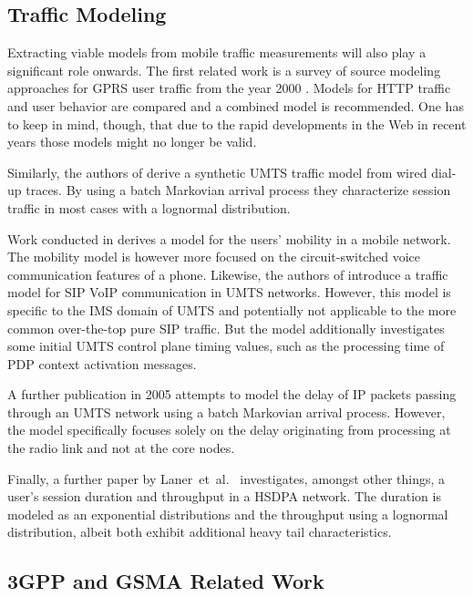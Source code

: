 \subsection{Traffic Modeling}

Extracting viable models from mobile traffic measurements will also play a significant role onwards. The first related work is a survey of source modeling approaches for \gls{GPRS} user traffic from the year 2000 \cite{staehle2000source}. Models for \gls{HTTP} traffic and user behavior are compared and a combined model is recommended. One has to keep in mind, though, that due to the rapid developments in the Web in recent years those models might no longer be valid. 

Similarly, the authors of \cite{965876} derive a synthetic \gls{UMTS} traffic model from wired dial-up traces. By using a batch Markovian arrival process they characterize session traffic in most cases with a lognormal distribution.

Work conducted in \cite{Halepovic:2005:CMU:1089803.1089969} derives a model for the users' mobility in a mobile network. The mobility model is however more focused on the circuit-switched voice communication features of a phone. Likewise, the authors of \cite{Pesch2005385} introduce a traffic model for \gls{SIP} \gls{VoIP} communication in \gls{UMTS} networks. However, this model is specific to the \gls{IMS} domain of \gls{UMTS} and potentially not applicable to the more common over-the-top pure \gls{SIP} traffic. But the model additionally investigates some initial \gls{UMTS} control plane timing values, such as the processing time of \gls{PDP} context activation messages.

A further publication in 2005 \cite{Landman200568} attempts to model the delay of \gls{IP} packets passing through an \gls{UMTS} network using a batch Markovian arrival process. However, the model specifically focuses solely on the delay originating from processing at the radio link and not at the core nodes.

Finally, a further paper by Laner~et~al.~\cite{6214330} investigates, amongst other things, a user's session duration and throughput in a \gls{HSDPA} network. The duration is modeled as an exponential distributions and the throughput using a lognormal distribution, albeit both exhibit additional heavy tail characteristics.


\subsection{\texorpdfstring{\acrshort{3GPP}}{3GPP} and \texorpdfstring{\acrshort{GSMA}}{GSMA} Related Work}

